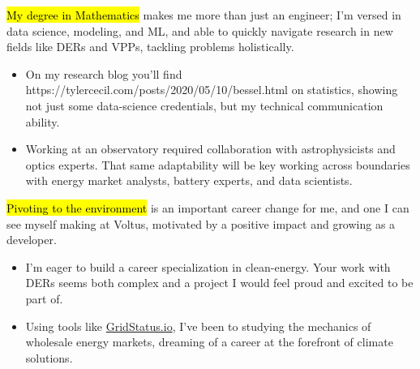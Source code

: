 \documentclass{tc_cv}
\begin{document}
\begin{adjustwidth}{40pt}{40pt}
\begin{itemize}
  \end{itemize} \medskip

  \hl{My degree in Mathematics} makes me more than just an engineer; I'm versed
  in data science, modeling, and ML, and able to quickly navigate research in
  new fields like DERs and VPPs, tackling problems holistically.

  \begin{itemize}

    \item On my research blog you'll find \cite{Jupyter
      notebooks}{https://tylercecil.com/posts/2020/05/10/bessel.html} on
      statistics, showing not just some data-science credentials, but my
      technical communication ability.

    \item Working at an observatory required collaboration with astrophysicists
      and optics experts. That same adaptability will be key working across
      boundaries with energy market analysts, battery experts, and data
      scientists.

  \end{itemize} \medskip

  \hl{Pivoting to the environment} is an important career change for me, and
  one I can see myself making at Voltus, motivated by a positive impact
  and growing as a developer.
  \begin{itemize}

    \item I'm eager to build a career specialization in clean-energy. Your work
      with DERs seems both complex and a project I would feel proud and excited
      to be part of.

    \item Using tools like
      \href{http://gridwatch.io}{GridStatus.io}, I've been
      to studying the mechanics of wholesale energy markets, dreaming of a
      career at the forefront of climate solutions.


\end{itemize}
\end{adjustwidth}
\end{document}
